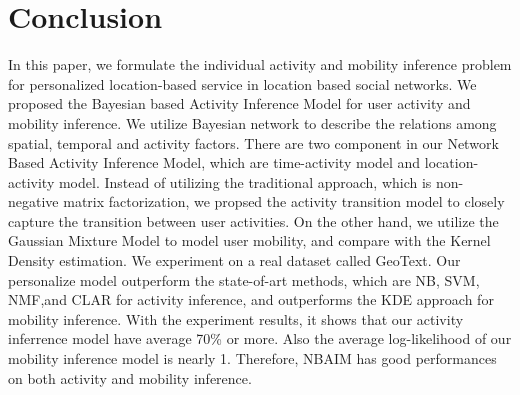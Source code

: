 \chapter{Conclusion}
\label{sec:6}

In this paper, we formulate the individual activity and mobility inference problem for personalized location-based service in location based social networks. We proposed the Bayesian based Activity Inference Model for user activity and mobility inference. We utilize Bayesian network to describe the relations among spatial, temporal and activity factors. There are two component in our Network Based Activity Inference Model, which are time-activity model and location-activity model. Instead of utilizing the traditional approach, which is non-negative matrix factorization, we propsed the activity transition model to closely capture the transition between user activities. On the other hand, we utilize the Gaussian Mixture Model to model user mobility, and compare with the Kernel Density estimation. We experiment on a real dataset called GeoText. Our personalize model outperform the state-of-art methods, which are NB, SVM, NMF,and CLAR for activity inference, and outperforms the KDE approach for mobility inference. With the experiment results, it shows that our activity inferrence model have average 70\% or more. Also the average log-likelihood of our mobility inference model is nearly 1. Therefore, NBAIM has good performances on both activity and mobility inference.